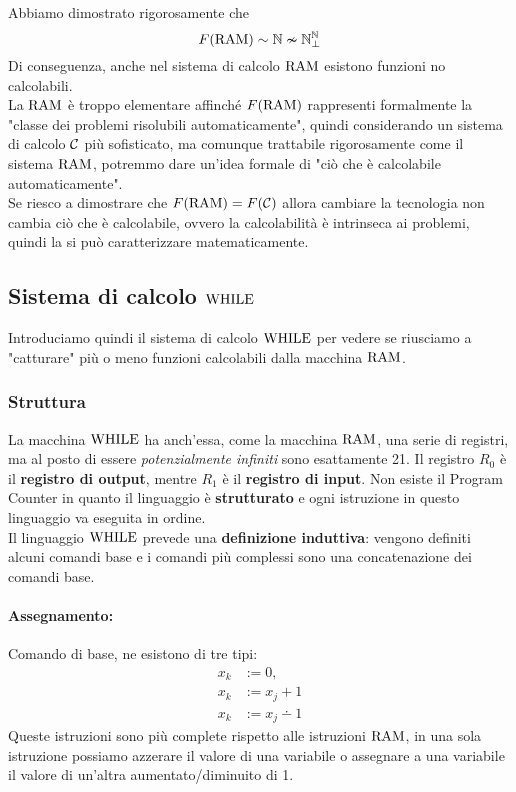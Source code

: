 Abbiamo dimostrato rigorosamente che 
$$ F(\text{RAM}) \sim \mathbb{N} \nsim \mathbb{N}^{\mathbb{N}}_\bot $$
Di conseguenza, anche nel sistema di calcolo $\text{RAM}$ esistono funzioni no calcolabili.\\

La $\text{RAM}$ è troppo elementare affinché $F(\text{RAM})$ rappresenti formalmente la "classe dei problemi risolubili automaticamente", quindi considerando un sistema di calcolo $\mathcal{C}$ più sofisticato, ma comunque trattabile rigorosamente come il sistema $\text{RAM}$, potremmo dare un'idea formale di "ciò che è calcolabile automaticamente".\\

Se riesco a dimostrare che $F(\text{RAM}) = F(\mathcal{C})$ allora cambiare la tecnologia non cambia ciò che è calcolabile, ovvero la calcolabilità è intrinseca ai problemi, quindi la si può caratterizzare matematicamente. \\

\subsection{Sistema di calcolo $\text{WHILE}$}
Introduciamo quindi il sistema di calcolo $\text{WHILE}$ per vedere se riusciamo a "catturare" più o meno funzioni calcolabili dalla macchina $\text{RAM}$.

\subsubsection{Struttura}
La macchina $\text{WHILE}$ ha anch'essa, come la macchina $\text{RAM}$, una serie di registri, ma al posto di essere \textit{potenzialmente infiniti} sono esattamente 21. Il registro $R_0$ è il \textbf{registro di output}, mentre $R_1$ è il \textbf{registro di input}. Non esiste il Program Counter in quanto il linguaggio è \textbf{strutturato} e ogni istruzione in questo linguaggio va eseguita in ordine.\\

Il linguaggio $\text{WHILE}$ prevede una \textbf{definizione induttiva}: vengono definiti alcuni comandi base e i comandi più complessi sono una concatenazione dei comandi base.\\

\paragraph{Assegnamento:} Comando di base, ne esistono di tre tipi: 
\begin{align*}
	x_k & := 0, \\
	x_k & := x_j + 1 \\
	x_k & := x_j \dotminus 1
\end{align*}
Queste istruzioni sono più complete rispetto alle istruzioni $\text{RAM}$, in una sola istruzione possiamo azzerare il valore di una variabile o assegnare a una variabile il valore di un'altra aumentato/diminuito di 1.

